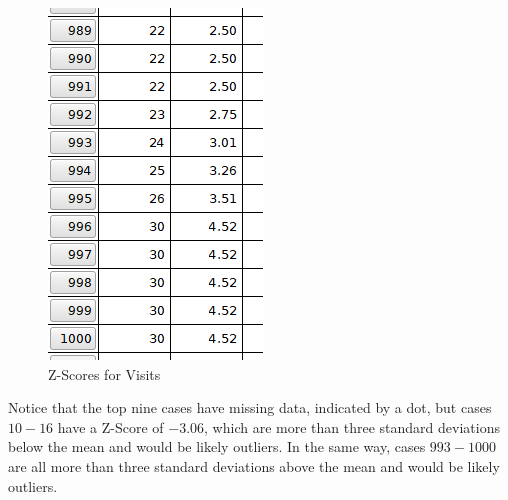\begin{figure}[H]
  \begin{minipage}{.45\linewidth}%
    \includegraphics[width=\linewidth]{gfx/lab05_fig06}
  \end{minipage}%
  \caption{Z-Scores for Visits}%
  \label{lab05_fig05}%
\end{figure}

Notice that the top nine cases have missing data, indicated by a dot, but cases $ 10-16 $ have a Z-Score of $ -3.06 $, which are more than three standard deviations below the mean and would be likely outliers. In the same way, cases $ 993-1000 $ are all more than three standard deviations above the mean and would be likely outliers.

